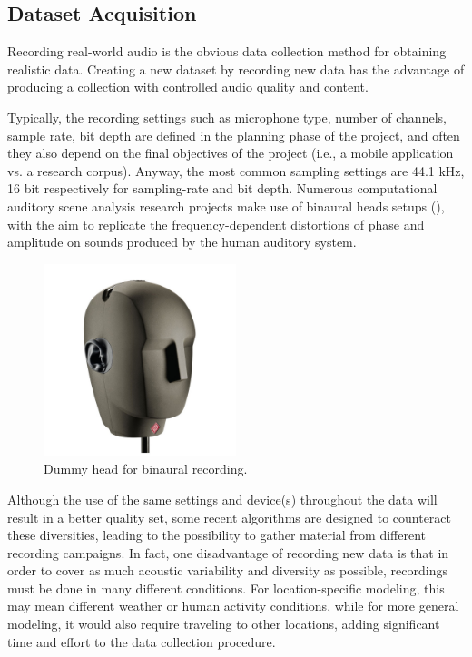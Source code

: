 \subsection{Dataset Acquisition}

Recording real-world audio is the obvious data collection method for obtaining
realistic data. Creating a new dataset by recording new data has the advantage of
producing a collection with controlled audio quality and content.

Typically, the recording settings such as microphone type, number of channels, sample rate, bit depth are defined in the planning phase of the project, and often they also depend on the final objectives of the project (i.e., a mobile application vs. a research corpus). Anyway, the most common sampling settings are 44.1 kHz, 16 bit respectively for sampling-rate and bit depth. Numerous computational auditory scene analysis research projects make use of binaural heads setups (), with the aim to replicate the frequency-dependent distortions of phase and amplitude on sounds produced by the human auditory system.

\begin{figure}[h]
	\centering
	\includegraphics[width=0.5\textwidth]{img/binaural.jpg}
	\caption[Dummy head]{Dummy head for binaural recording.}
	\label{fig:binaural}
\end{figure}

Although the use
of the same settings and device(s) throughout the data will result in a better
quality set, some recent algorithms are designed to counteract these diversities, leading to the possibility to gather material from different recording campaigns. 
In fact, one disadvantage of recording new data is that in order to cover as much acoustic variability
and diversity as possible, recordings must be done in many different conditions.
For location-specific modeling, this may mean different weather or human activity
conditions, while for more general modeling, it would also require traveling to
other locations, adding significant time and effort to the data collection procedure.

